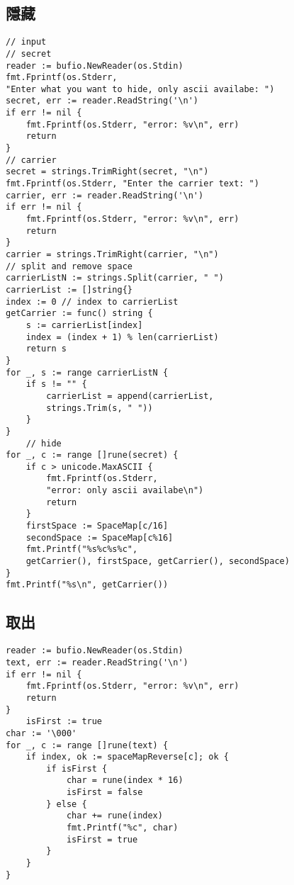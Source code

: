 \documentclass[12pt,a4paper]{article}
\begin{document}
\subsection{隱藏}
\begin{lstlisting}
// input
// secret
reader := bufio.NewReader(os.Stdin)
fmt.Fprintf(os.Stderr,
"Enter what you want to hide, only ascii availabe: ")
secret, err := reader.ReadString('\n')
if err != nil {
	fmt.Fprintf(os.Stderr, "error: %v\n", err)
	return
}
// carrier
secret = strings.TrimRight(secret, "\n")
fmt.Fprintf(os.Stderr, "Enter the carrier text: ")
carrier, err := reader.ReadString('\n')
if err != nil {
	fmt.Fprintf(os.Stderr, "error: %v\n", err)
	return
}
carrier = strings.TrimRight(carrier, "\n")
// split and remove space
carrierListN := strings.Split(carrier, " ")
carrierList := []string{}
index := 0 // index to carrierList
getCarrier := func() string {
	s := carrierList[index]
	index = (index + 1) % len(carrierList)
	return s
}
for _, s := range carrierListN {
	if s != "" {
		carrierList = append(carrierList, 
		strings.Trim(s, " "))
	}
}
	// hide
for _, c := range []rune(secret) {
	if c > unicode.MaxASCII {
		fmt.Fprintf(os.Stderr,
		"error: only ascii availabe\n")
		return
	}
	firstSpace := SpaceMap[c/16]
	secondSpace := SpaceMap[c%16]
	fmt.Printf("%s%c%s%c", 
	getCarrier(), firstSpace, getCarrier(), secondSpace)
}
fmt.Printf("%s\n", getCarrier())
\end{lstlisting}

\subsection{取出}
\begin{lstlisting}
reader := bufio.NewReader(os.Stdin)
text, err := reader.ReadString('\n')
if err != nil {
	fmt.Fprintf(os.Stderr, "error: %v\n", err)
	return
}
	isFirst := true
char := '\000'
for _, c := range []rune(text) {
	if index, ok := spaceMapReverse[c]; ok {
		if isFirst {
			char = rune(index * 16)
			isFirst = false
		} else {
			char += rune(index)
			fmt.Printf("%c", char)
			isFirst = true
		}
	}
}
\end{lstlisting}
\end{document}
